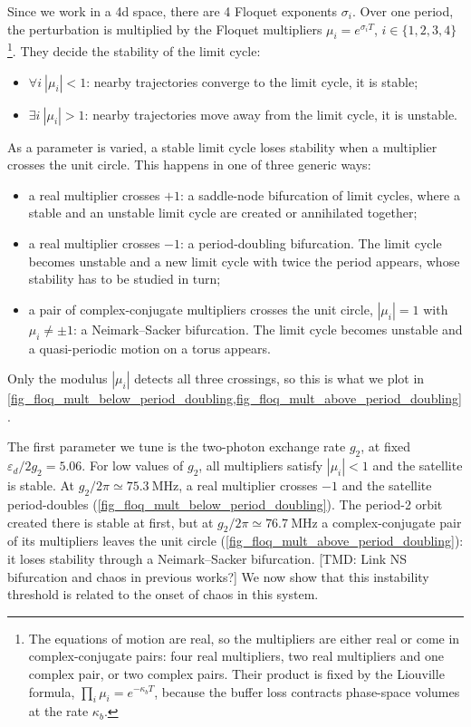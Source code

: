\documentclass[aps,prx,reprint,floatfix,amsmath,amssymb,longbibliography]{revtex4-2}
\newcommand{\eps}{\varepsilon}
\newcommand{\TMD}[1]{{\color{Blue} [TMD: {#1}]}}
\begin{document}
Since we work in a 4d space, there are 4 Floquet exponents $\sigma_i$. Over one period, the perturbation is multiplied by the Floquet multipliers $\mu_i=e^{\sigma_iT}$, $i\in\{1,2,3,4\}$\footnote{The equations of motion are real, so the multipliers are either real or come in complex-conjugate pairs: four real multipliers, two real multipliers and one complex pair, or two complex pairs. Their product is fixed by the Liouville formula, $\prod_i\mu_i=e^{-\kappa_bT}$, because the buffer loss contracts phase-space volumes at the rate $\kappa_b$.}. They decide the stability of the limit cycle:
\begin{itemize}
    \item $\forall i \: |\mu_i|<1$: nearby trajectories converge to the limit cycle, it is stable;
    \item $\exists i\:|\mu_i|>1$: nearby trajectories move away from the limit cycle, it is unstable.
\end{itemize}
As a parameter is varied, a stable limit cycle loses stability when a multiplier crosses the unit circle. This happens in one of three generic ways:
\begin{itemize}
    \item a real multiplier crosses $+1$: a saddle-node bifurcation of limit cycles, where a stable and an unstable limit cycle are created or annihilated together;
    \item a real multiplier crosses $-1$: a period-doubling bifurcation. The limit cycle becomes unstable and a new limit cycle with twice the period appears, whose stability has to be studied in turn;
    \item a pair of complex-conjugate multipliers crosses the unit circle, $|\mu_i|=1$ with $\mu_i\neq\pm1$: a Neimark--Sacker bifurcation. The limit cycle becomes unstable and a quasi-periodic motion on a torus appears.
\end{itemize}
Only the modulus $|\mu_i|$ detects all three crossings, so this is what we plot in \cref{fig_floq_mult_below_period_doubling,fig_floq_mult_above_period_doubling}.

The first parameter we tune is the two-photon exchange rate $g_2$, at fixed $\eps_d/2g_2=5.06$. For low values of $g_2$, all multipliers satisfy $|\mu_i|<1$ and the satellite is stable. At $g_2/2\pi\simeq75.3~\mathrm{MHz}$, a real multiplier crosses $-1$ and the satellite period-doubles (\cref{fig_floq_mult_below_period_doubling}). The period-2 orbit created there is stable at first, but at $g_2/2\pi\simeq76.7~\mathrm{MHz}$ a complex-conjugate pair of its multipliers leaves the unit circle (\cref{fig_floq_mult_above_period_doubling}): it loses stability through a Neimark--Sacker bifurcation. \TMD{Link NS bifurcation and chaos in previous works?} We now show that this instability threshold is related to the onset of chaos in this system.
\end{document}
